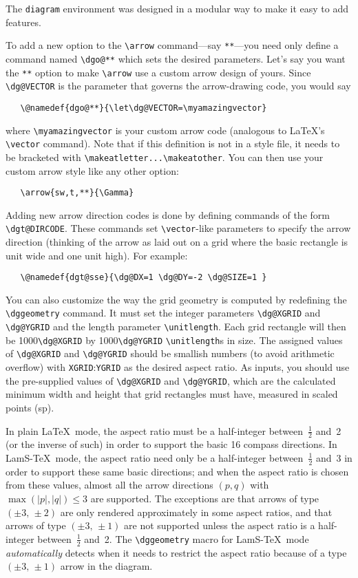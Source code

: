 The \verb"diagram" environment was designed in a modular way to make 
it easy to add features.

To add a new option to the \verb"\arrow" command---say 
\verb"**"---you need only define a command named \verb"\dgo@**" which 
sets the desired parameters.  Let's say you want the \verb"**" option 
to make \verb"\arrow" use a custom arrow design of yours.  Since 
\verb"\dg@VECTOR" is the parameter that governs the arrow-drawing 
code, you would say
\begin{verbatim}
   \@namedef{dgo@**}{\let\dg@VECTOR=\myamazingvector}
\end{verbatim}
where \verb"\myamazingvector" is your custom arrow code (analogous
to \LaTeX's \verb"\vector" command).  Note that if this definition is 
not in a style file, it needs to be bracketed with 
\verb"\makeatletter...\makeatother".  You can then use your custom 
arrow style like any other option:
\begin{verbatim}
   \arrow{sw,t,**}{\Gamma}
\end{verbatim}

Adding new arrow direction codes is done by defining commands of the 
form \verb"\dgt@DIRCODE".  These commands set \verb"\vector"-like 
parameters to specify the arrow direction (thinking of the arrow as 
laid out on a grid where the basic rectangle is unit wide and one 
unit high).  For example:
\begin{verbatim}
   \@namedef{dgt@sse}{\dg@DX=1 \dg@DY=-2 \dg@SIZE=1 }
\end{verbatim}

You can also customize the way the grid geometry is computed by
redefining the \verb"\dggeometry" command.  It must set 
the integer parameters \verb"\dg@XGRID" and \verb"\dg@YGRID" and
the length parameter \verb"\unitlength".  Each grid rectangle
will then be 1000\verb"\dg@XGRID" by 1000\verb"\dg@YGRID"
\verb"\unitlength"s in size.  The assigned values of
\verb"\dg@XGRID" and \verb"\dg@YGRID" should be smallish numbers
(to avoid arithmetic overflow) with \verb"XGRID":\verb"YGRID"
as the desired aspect ratio.  As inputs,
you should use the pre-supplied values of \verb"\dg@XGRID" and
\verb"\dg@YGRID", which are the calculated minimum width and
height that grid rectangles must have, measured in scaled
points (sp).

In plain \LaTeX\ mode, the aspect ratio must be a half-integer 
between~$\tfrac12$ and~2 (or the inverse of such) in order to
support the basic 16 compass directions.  In LamS-\TeX\ mode,
the aspect ratio need only be a half-integer between~$\tfrac12$
and~3 in order to support these same basic directions; and when
the aspect ratio is chosen from these values, almost all the
arrow directions $(p,q)$ with $\max(|p|,|q|)\le 3$ are supported.
The exceptions are that arrows of type $(\pm 3,\,\pm 2)$ are
only rendered approximately in some aspect ratios, and that
arrows of type $(\pm 3,\,\pm 1)$ are not supported unless
the aspect ratio is a half-integer between~$\tfrac12$ and~2.
The \verb"\dggeometry" macro for LamS-\TeX\ mode
{\em automatically\/} detects when it needs to restrict the
aspect ratio because of a type $(\pm 3,\,\pm 1)$ arrow in
the diagram.

